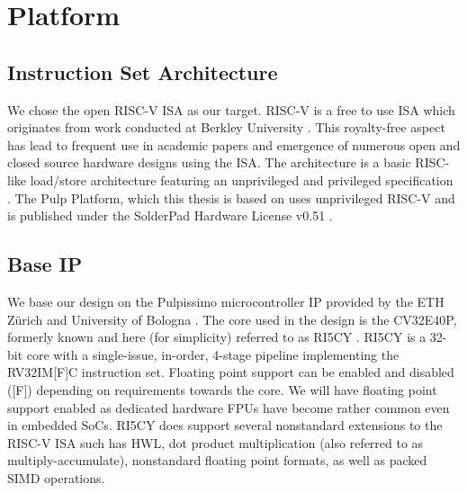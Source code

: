 \documentclass[../bachelor_paper.tex]{subfiles}
\begin{document}
\chapter{Platform}
    \label{ch:plat}

\section{Instruction Set Architecture}
We chose the open RISC-V \ac{ISA} as our target. RISC-V is a free to use \acf{ISA} which originates from work conducted at Berkley University \cite{HistoryRISCV2022}. This royalty-free aspect has lead to frequent use in academic papers and emergence of numerous open and closed source hardware designs using the \ac{ISA}. The architecture is a basic RISC-like load/store architecture featuring an unprivileged and privileged specification \cite{RISCVInstructionSet2022}. The Pulp Platform, which this thesis is based on uses unprivileged RISC-V and is published under the SolderPad Hardware License v0.51 \cite{GitHubPulpplatformPulpissimo2021}.

\section{Base IP}
    \label{sec:plat:base}
We base our design on the Pulpissimo microcontroller IP provided by the ETH Z\"urich and University of Bologna \cite{schiavoneQuentinUltraLowPowerPULPissimo2018}. The core used in the design is the CV32E40P, formerly known and here (for simplicity) referred to as RI5CY \cite{gautschiNearThresholdRISCVCore2017}. RI5CY is a 32-bit core with a single-issue, in-order, 4-stage pipeline implementing the RV32IM[F]C instruction set. Floating point support can be enabled and disabled ([F]) depending on requirements towards the core. We will have floating point support enabled as dedicated hardware \acp{FPU} have become rather common even in embedded \acp{SoC}. RI5CY does support several nonstandard extensions to the RISC-V \ac{ISA} such has \acl{HWL}, dot product multiplication (also referred to as multiply-accumulate), nonstandard floating point formats, as well as packed SIMD operations.
\end{document}
